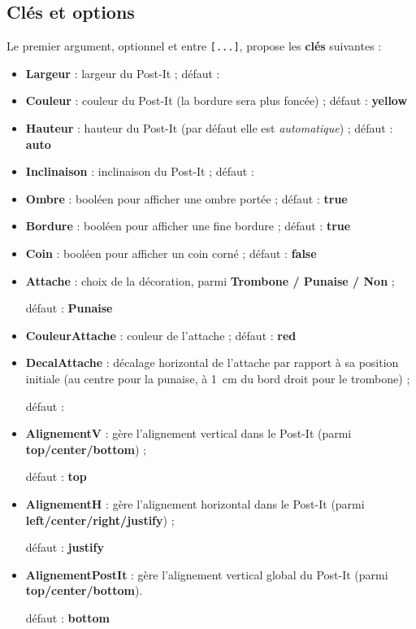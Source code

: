 \documentclass[french,a4paper,11pt]{article}
\newcommand\Cle[1]{{\bfseries\sffamily\textlangle #1\textrangle}}
\begin{document}
\subsection{Clés et options}

\begin{tipblock}
Le premier argument, optionnel et entre \texttt{[...]}, propose les \Cle{clés} suivantes :

\begin{itemize}
	\item \Cle{Largeur} : largeur du Post-It  ; \hfill{}défaut : \Cle{6cm}
	\item \Cle{Couleur} : couleur du Post-It (la bordure sera plus foncée) ; \hfill{}défaut : \Cle{yellow}
	\item \Cle{Hauteur} : hauteur du Post-It (par défaut elle est \textit{automatique}) ; \hfill{}défaut : \Cle{auto}
	\item \Cle{Inclinaison} : inclinaison du Post-It ; \hfill{}défaut : \Cle{0}
	\item \Cle{Ombre} : booléen pour afficher une ombre portée ; \hfill{}défaut : \Cle{true}
	\item \Cle{Bordure} : booléen pour afficher une fine bordure ; \hfill{}défaut : \Cle{true}
	\item \Cle{Coin} : booléen pour afficher un coin corné ; \hfill{}défaut : \Cle{false}
	\item \Cle{Attache} : choix de la décoration, parmi \Cle{Trombone / Punaise / Non} ;
	
	\hfill{}défaut : \Cle{Punaise}
	\item \Cle{CouleurAttache} : couleur de l'attache ; \hfill{}défaut : \Cle{red}
	\item \Cle{DecalAttache} : décalage horizontal de l'attache par rapport à sa position initiale (au centre pour la punaise, à 1~cm du bord droit pour le trombone) ;
	
	\hfill{}défaut : \Cle{0cm}
	\item \Cle{AlignementV} : gère l'alignement vertical dans le Post-It (parmi \Cle{top/center/bottom}) ;
	
	\hfill{}défaut : \Cle{top}
	\item \Cle{AlignementH} : gère l'alignement horizontal dans le Post-It (parmi \Cle{left/center/right/justify}) ;
	
	\hfill{}défaut : \Cle{justify}
	\item \Cle{AlignementPostIt} : gère l'alignement vertical global du Post-It (parmi \Cle{top/center/bottom}).
	
	\hfill{}défaut : \Cle{bottom}
\end{itemize}
\vspace*{-\baselineskip}\leavevmode
\end{tipblock}
\end{document}
